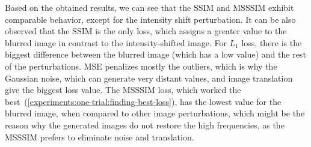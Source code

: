 Based on the obtained results, we can see that the SSIM and MSSSIM exhibit comparable behavior, except for the intensity shift perturbation. It can be also observed that the SSIM is the only loss, which assigns a greater value to the blurred image in contrast to the intensity-shifted image.
For $L_1$ loss, there is the biggest difference between the blurred image (which has a low value) and the rest of the perturbations. MSE penalizes mostly the outliers, which is why the Gaussian noise, which can generate very distant values, and image translation give the biggest loss value. The MSSSIM loss, which worked the best~(\ref{experiments:one-trial:finding-best-loss}), has the lowest value for the blurred image, when compared to other image perturbations, which might be the reason why the generated images do not restore the high frequencies, as the MSSSIM prefers to eliminate noise and translation.
